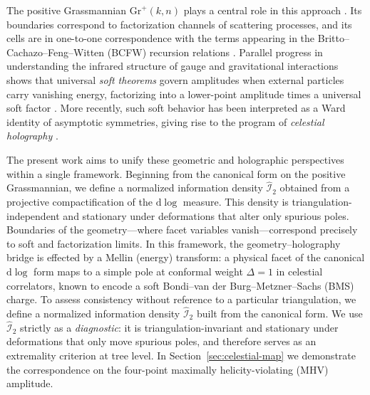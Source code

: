 \documentclass[11pt]{article}
\begin{document}
The positive Grassmannian $\mathrm{Gr}^+(k,n)$ plays a central role in this approach \citep{Postnikov2006,LamWilliams2015}. Its boundaries correspond to factorization channels of scattering processes, and its cells are in one-to-one correspondence with the terms appearing in the Britto--Cachazo--Feng--Witten (BCFW) recursion relations \citep{BrittoCachazoFengWitten2005}. Parallel progress in understanding the infrared structure of gauge and gravitational interactions shows that universal \emph{soft theorems} govern amplitudes when external particles carry vanishing energy, factorizing into a lower-point amplitude times a universal soft factor \citep{Low1954,Weinberg1965}. More recently, such soft behavior has been interpreted as a Ward identity of asymptotic symmetries, giving rise to the program of \emph{celestial holography} \citep{Strominger2018,PasterskiShaoStrominger2017,Raclariu2021}.

The present work aims to unify these geometric and holographic perspectives within a single framework. Beginning from the canonical form on the positive Grassmannian, we define a normalized information density $\widehat{\mathcal I}_2$ obtained from a projective compactification of the $\mathrm{d}\!\log$ measure. This density is triangulation-independent and stationary under deformations that alter only spurious poles. Boundaries of the geometry---where facet variables vanish---correspond precisely to soft and factorization limits. In this framework, the geometry–holography bridge is effected by a Mellin (energy) transform: a physical facet of the canonical $\mathrm{d}\!\log$ form maps to a simple pole at conformal weight $\Delta=1$ in celestial correlators, known to encode a soft Bondi--van der Burg--Metzner--Sachs (BMS) charge. To assess consistency without reference to a particular triangulation, we define a normalized information density $\widehat{\mathcal I}_2$ built from the canonical form. We use $\widehat{\mathcal I}_2$ strictly as a \emph{diagnostic}: it is triangulation-invariant and stationary under deformations that only move spurious poles, and therefore serves as an extremality criterion at tree level. In Section~\ref{sec:celestial-map} we demonstrate the correspondence on the four-point maximally helicity-violating (MHV) amplitude.
\end{document}
